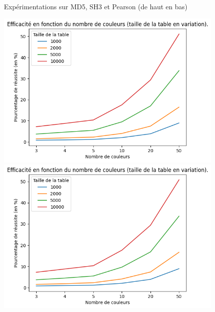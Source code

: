 \documentclass[french,12pt]{article}
\begin{document}
\begin{figure}[hbt!]
    \hspace{0mm}
    
    \caption{Expérimentations sur MD5, SH3 et Pearson (de haut en bas)}
    \label{fig:CST} 
    \end{figure}
    
    \newpage
     \begin{figure}[hbt!]
     \centering
    
      \includegraphics[scale=0.65]{img/graphe/md5/C_T_S_137092_MotGenerator.png}
    
      \includegraphics[scale=0.65]{img/graphe/sha3/C_T_S_137092_MotGenerator.png}


\end{figure}
\end{document}
